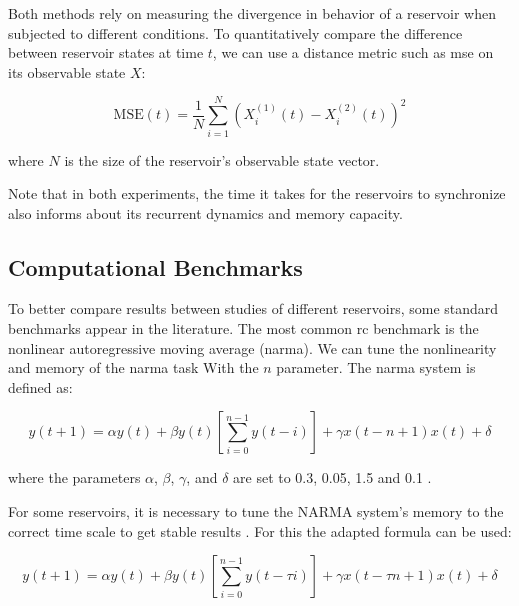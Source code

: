 Both methods rely on measuring the divergence in behavior of a reservoir when subjected to different conditions. 
To quantitatively compare the difference between reservoir states at time $t$, we can use a distance metric such as \acrfull{mse} on its observable state $X$:

\begin{equation} \label{eq:MSE}
    \text{MSE}(t) = \frac{1}{N} \sum_{i=1}^{N} \left( X_i^{(1)}(t) - X_i^{(2)}(t) \right)^{2}
\end{equation}

where $N$ is the size of the reservoir's observable state vector.


Note that in both experiments, the time it takes for the reservoirs to synchronize also informs about its recurrent dynamics and memory capacity.



\subsection{Computational Benchmarks}

To better compare results between studies of different reservoirs, some standard benchmarks appear in the literature.
The most common \acrshort{rc} benchmark is the nonlinear autoregressive moving average (\acrshort{narma}).
We can tune the nonlinearity and memory of the \acrshort{narma} task With the $n$ parameter.
The \acrshort{narma} system is defined as:

\begin{equation} \label{prc:narma}
    y(t+1) = \alpha y(t) + \beta y(t) \left[ \sum_{i=0}^{n-1} y(t-i) \right] + \gamma x(t-n+1) x(t) + \delta
\end{equation}

where the parameters $\alpha$, $\beta$, $\gamma$, and $\delta$ are set to 0.3, 0.05, 1.5 and 0.1 \citep{nakajima_information_2015}.

For some reservoirs, it is necessary to tune the NARMA system's memory to the correct time scale to get stable results \citep{pieters_reservoir_2022}.
For this the adapted formula can be used:

\begin{equation} \label{prc:narma-timescale-adapted}
    y(t+1) = \alpha y(t) + \beta y(t) \left[ \sum_{i=0}^{n-1} y(t-\tau i) \right] + \gamma x(t-\tau n+1) x(t) + \delta
\end{equation}

